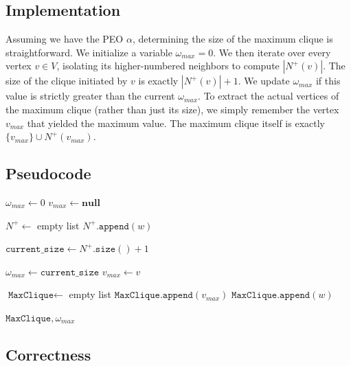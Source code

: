 \subsection{Implementation}
Assuming we have the PEO $\alpha$, determining the size of the maximum clique is straightforward. We initialize a variable $\omega_{max} = 0$. We then iterate over every vertex $v \in V$, isolating its higher-numbered neighbors to compute $|N^+(v)|$. The size of the clique initiated by $v$ is exactly $|N^+(v)| + 1$. We update $\omega_{max}$ if this value is strictly greater than the current $\omega_{max}$. To extract the actual vertices of the maximum clique (rather than just its size), we simply remember the vertex $v_{max}$ that yielded the maximum value. The maximum clique itself is exactly $\{v_{max}\} \cup N^+(v_{max})$.

\subsection{Pseudocode}

\begin{algorithm}[H]
\caption{Find Maximum Clique}
\begin{algorithmic}[1]
    \State $\omega_{max} \gets 0$
    \State $v_{max} \gets \textbf{null}$
    
        \State $N^+ \gets$ empty list
            \If{$\alpha[v] < \alpha[w]$}
                \State $N^+.\texttt{append}(w)$
            \EndIf
        \EndFor
        
        \State $\texttt{current\_size} \gets N^+.\texttt{size}() + 1$
        
            \State $\omega_{max} \gets \texttt{current\_size}$
            \State $v_{max} \gets v$
        \EndIf
    \EndFor
    
    \State $\texttt{MaxClique} \gets$ empty list
    \State $\texttt{MaxClique}.\texttt{append}(v_{max})$
        \If{$\alpha[v_{max}] < \alpha[w]$}
            \State $\texttt{MaxClique}.\texttt{append}(w)$
        \EndIf
    \EndFor
    
    \State \Return $\texttt{MaxClique}, \omega_{max}$
\EndFunction
\end{algorithmic}
\end{algorithm}

\subsection{Correctness}

